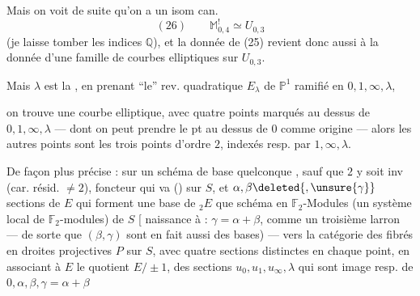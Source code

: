 Mais on voit de suite qu'on a un isom can.
\[
(26)\qquad \mathbb{M}_{0,4}^{!}\simeq U_{0,3}
\]
(je laisse tomber les indices $\mathbb{Q}$), et la donnée de (25) revient donc aussi à la donnée d'une famille de courbes elliptiques sur $U_{0,3}$.

Mais  $\lambda$ est la , en prenant ``le'' rev. quadratique $E_\lambda$ de  $\mathbb{P}^1$ ramifié en $0,1,\infty,\lambda$,


on trouve une courbe elliptique, avec quatre points marqués  au dessus de $0,1,\infty,\lambda$ --- dont on peut prendre le pt au dessus de $0$ comme origine --- alors les autres points sont les trois points d'ordre $2$, indexés resp. par $1,\infty,\lambda$.

De façon plus précise : sur un schéma de base quelconque , sauf que $2$ y soit inv (car. résid.  $\ne 2$),   foncteur qui va     ()   sur $S$, et  $\alpha,\beta\deleted{,\unsure{\gamma}}$   sections de $E$ qui forment une base de ${}_2E$  que schéma  en $\mathbb{F}_2$-Modules (un système local de $\mathbb{F}_2$-modules) de $S$ [ naissance à : $\gamma=\alpha+\beta$, comme un troisième larron --- de sorte que $(\beta,\gamma)$   sont en fait aussi des bases) --- vers la catégorie des fibrés en droites projectives $P$ sur $S$, avec quatre sections   distinctes en chaque point, en associant à $E$ le quotient $E/\pm1$,  des sections $u_0,u_1,u_\infty,\lambda$ qui sont image resp. de $0,\alpha,\beta,\gamma=\alpha+\beta$




